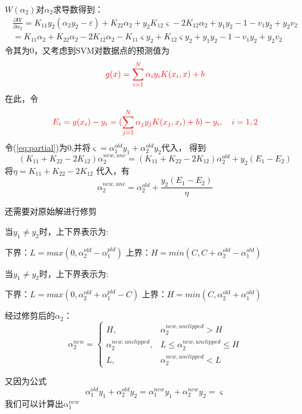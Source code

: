 \documentclass{article}
\begin{document}
$W(\alpha_2)$对$\alpha_2$求导数得到：
\begin{gather}
    \frac{\partial W}{\partial \alpha_2}=K_{11}y_2(\alpha_2 y_2 -\varepsilon)+K_{22}\alpha_2 +y_2 K_{12}\varsigma-2K_{12}\alpha_2+y_1 y_2 -1-v_1y_2+y_2 v_2 \nonumber\\
    =K_{11}\alpha_2 +K_{22}\alpha_2 -2K_{12}\alpha_2-K_{11}\varsigma y_2+K_{12}\varsigma y_2+y_1 y_2 -1-v_1y_2+y_2 v_2 \label{eq:partial}
\end{gather}
令其为0，又考虑到SVM对数据点的预测值为
\begin{equation}
    {\color{red}g(x)=\sum_{i=1}^{N}\alpha_i y_i K(x_i,x) +b}
\end{equation}
在此，令
\begin{equation}
    {\color{red}E_i=g(x_i)-y_i=(\sum_{j=1}^{N}\alpha_j y_j K(x_j,x_i) +b)-y_i,\quad i=1,2} \label{eq:E}
\end{equation}
令(\ref{eq:partial})为0,并将$\varsigma=\alpha_1^{old} y_1+\alpha_2^{old} y_2$代入，
得到
\begin{equation}
    (K_{11}+K_{22}-2K_{12})\alpha_2^{new,unc}=(K_{11}+K_{22}-2K_{12})\alpha_2^{old}+y_2(E_1-E_2)
\end{equation}
将$\eta=K_{11}+K_{22}-2K_{12}$ 代入，有
\begin{equation}
    \alpha_2^{new,unc}=\alpha_2^{old}+\frac{y_2(E_1-E_2)}{\eta}
\end{equation}


还需要对原始解进行修剪

当$y_1\neq y_2$时，上下界表示为:

下界：$L=max(0,\alpha_2^{old}-\alpha_1^{pld})$\quad
上界：$H=min(C,C+\alpha_2^{old}-\alpha_1^{old})$

当$y_1\neq y_2$时，上下界表示为:

下界：$L=max(0,\alpha_2^{old}+\alpha_1^{pld}-C)$\quad
上界：$H=min(C,\alpha_2^{old}+\alpha_1^{old})$

经过修剪后的$\alpha_2$：
\[
  \alpha_2^{new} = 
  \begin{cases}
    H, &\text{$\alpha_2^{new,unclipped}>H$}\\
    \alpha_2^{new,unclipped},&\text{$L\le\alpha_2^{new,unclipped}\le H$}\\
	L, &\text{$\alpha_2^{new,unclipped}<L$}
  \end{cases}
\]

又因为公式
\begin{equation}
    \alpha_1^{old}y_1 +\alpha_2^{old}y_2=\alpha_1^{new}y_1 +\alpha_2^{new}y_2=\varsigma
\end{equation}
我们可以计算出$\alpha_1^{new}$
\end{document}
